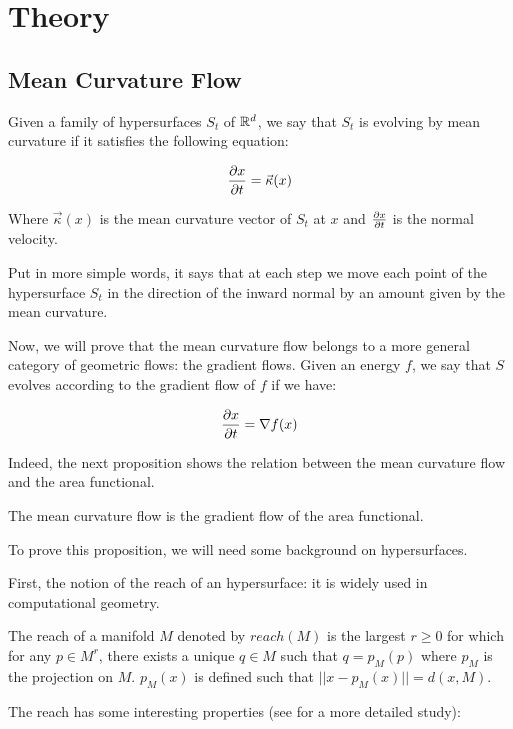\chapter{Theory}

\section{Mean Curvature Flow}

Given a family of hypersurfaces $ S_t $ of $ \mathbb{R}^d $, we say that $ S_t $ is
evolving by mean curvature if it satisfies the following equation:

$$ \frac{\partial{x}}{\partial{t}} = \vec{\kappa}(x) $$

Where $ \vec{\kappa}(x) $ is the mean curvature vector of $ S_t $ at $ x $ and
$ \frac{\partial{x}}{\partial{t}} $ is the normal velocity.

Put in more simple words, it says that at each step we move each point of the
hypersurface $ S_t $ in the direction of the inward normal by an amount given by
the mean curvature.

Now, we will prove that the mean curvature flow belongs to a more general
category of geometric flows: the gradient flows. Given an energy $ f $, we say
that $ S $ evolves according to the gradient flow of $ f $ if we have:

$$ \frac{\partial{x}}{\partial{t}} = \nabla f(x) $$

Indeed, the next proposition shows the relation between the mean curvature flow
and the area functional.

\begin{proposition}
    The mean curvature flow is the gradient flow of the area functional.
\end{proposition}

To prove this proposition, we will need some background on hypersurfaces.

First, the notion of the reach of an hypersurface: it is widely used in
computational geometry.
\begin{definition}
    The reach of a manifold $ M $ denoted by $ reach(M) $ is the largest $ r
    \geq 0 $ for which for any $ p \in M^r $, there exists a unique $ q \in M $
    such that $ q = p_M(p) $ where $ p_M $ is the projection on $ M $. $ p_M(x)
    $ is defined such that $ || x - p_M(x) || = d(x, M) $.
\end{definition}

The reach has some interesting properties (see \cite{merigot2009detection} for a
more detailed study):

